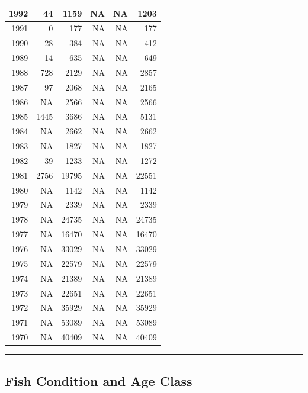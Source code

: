 \documentclass[
]{book}
\theoremstyle{definition}
\theoremstyle{definition}
\theoremstyle{definition}
\theoremstyle{definition}
\theoremstyle{remark}
\begin{document}
\begin{table}
\begin{tabular}[t]{rrrrrr}
\hline
1992 & 44 & 1159 & NA & NA & 1203\\
\hline
1991 & 0 & 177 & NA & NA & 177\\
\hline
1990 & 28 & 384 & NA & NA & 412\\
\hline
1989 & 14 & 635 & NA & NA & 649\\
\hline
1988 & 728 & 2129 & NA & NA & 2857\\
\hline
1987 & 97 & 2068 & NA & NA & 2165\\
\hline
1986 & NA & 2566 & NA & NA & 2566\\
\hline
1985 & 1445 & 3686 & NA & NA & 5131\\
\hline
1984 & NA & 2662 & NA & NA & 2662\\
\hline
1983 & NA & 1827 & NA & NA & 1827\\
\hline
1982 & 39 & 1233 & NA & NA & 1272\\
\hline
1981 & 2756 & 19795 & NA & NA & 22551\\
\hline
1980 & NA & 1142 & NA & NA & 1142\\
\hline
1979 & NA & 2339 & NA & NA & 2339\\
\hline
1978 & NA & 24735 & NA & NA & 24735\\
\hline
1977 & NA & 16470 & NA & NA & 16470\\
\hline
1976 & NA & 33029 & NA & NA & 33029\\
\hline
1975 & NA & 22579 & NA & NA & 22579\\
\hline
1974 & NA & 21389 & NA & NA & 21389\\
\hline
1973 & NA & 22651 & NA & NA & 22651\\
\hline
1972 & NA & 35929 & NA & NA & 35929\\
\hline
1971 & NA & 53089 & NA & NA & 53089\\
\hline
1970 & NA & 40409 & NA & NA & 40409\\
\hline
\end{tabular}
\end{table}

\begin{center}\rule{0.5\linewidth}{0.5pt}\end{center}

\hypertarget{fish-condition-and-age-class}{%
\subsection{Fish Condition and Age Class}\label{fish-condition-and-age-class}}
\end{document}
